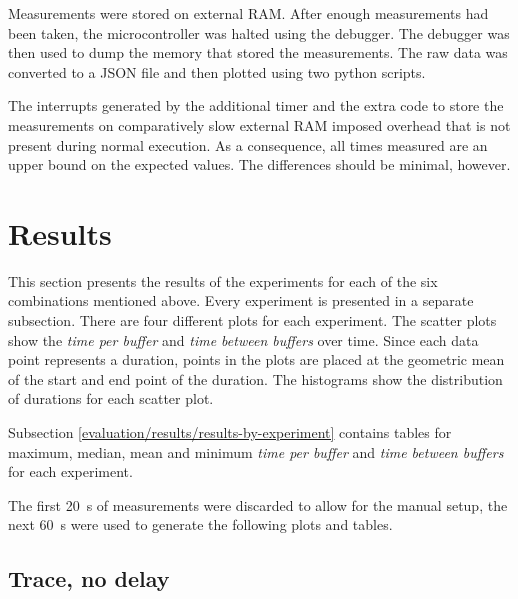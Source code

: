 Measurements were stored on external RAM. After enough measurements had been taken, the microcontroller
was halted using the debugger. The debugger was then used to dump the memory that stored the
measurements. The raw data was converted to a JSON file and then plotted using two python scripts.

The interrupts generated by the additional timer and the extra code to store the measurements on
comparatively slow external RAM imposed overhead that is not present during normal execution. As a
consequence, all times measured are an upper bound on the expected values. The differences should be
minimal, however.

\section{Results}
\label{evaluation/results}

This section presents the results of the experiments for each of the six combinations mentioned
above. Every experiment is presented in a separate subsection. There are four different plots
for each experiment. The scatter plots show the \textit{time per buffer} and
\textit{time between buffers} over time. Since each data point represents a duration, points in the
plots are placed at the geometric mean of the start and end point of the duration. The histograms
show the distribution of durations for each scatter plot.

Subsection \ref{evaluation/results/results-by-experiment} contains tables for maximum, median, mean
and minimum \textit{time per buffer} and \textit{time between buffers} for each experiment.

The first \SI{20}{\second} of measurements were discarded to allow for the manual setup, the next
\SI{60}{\second} were used to generate the following plots and tables.

\subsection{Trace, no delay}
\label{evaluation/results/trace-no-delay}

